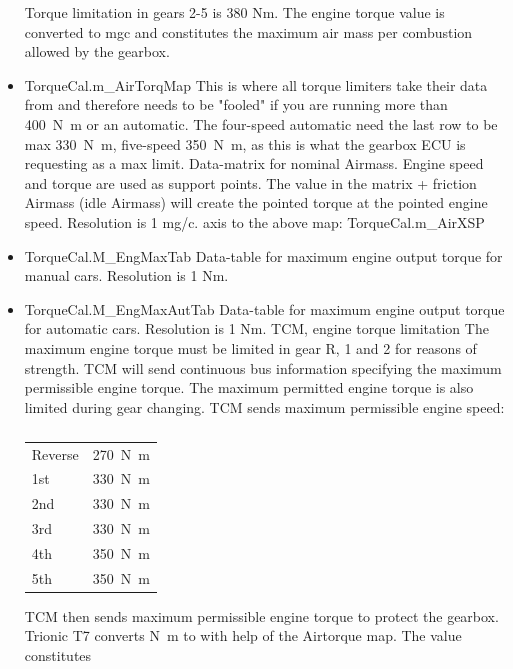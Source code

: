 \documentclass[11pt,a4paper]{book}
\begin{document}
\begin{itemize}
        Torque limitation in gears 2-5 is 380 Nm.
        The engine torque value is converted to \si{mgc} and constitutes the maximum air
        mass per combustion allowed by the gearbox.
    \item
        TorqueCal.m\_AirTorqMap This is where all torque limiters take their data from
        and therefore needs to be "fooled" if you are running more than
        \SI{400}{\newton\meter} or an automatic.
        The four-speed automatic need the last row to be max \SI{330}{\newton\meter},
        five-speed \SI{350}{\newton\meter}, as this is what the gearbox ECU is
        requesting as a max limit. Data-matrix for nominal Airmass. Engine speed and
        torque are used as support points. The value in the matrix + friction Airmass
        (idle Airmass) will create the pointed torque at the pointed engine speed.
        Resolution is 1 mg/c. axis to the above map: TorqueCal.m\_AirXSP
    \item
        TorqueCal.M\_EngMaxTab
        Data-table for maximum engine output torque for manual cars. Resolution is 1 Nm.
    \item
        TorqueCal.M\_EngMaxAutTab
        Data-table for maximum engine output torque for automatic cars. Resolution is 1 Nm.
        TCM, engine torque limitation
        The maximum engine torque must be limited in gear R, 1 and 2 for reasons of strength. TCM will send
        continuous bus information specifying the maximum permissible engine torque. The maximum
        permitted engine torque is also limited during gear changing. TCM sends maximum permissible engine
        speed:
        \begin{table}
            \centering
            \begin{tabular}{ll}
                Reverse & \SI{270}{\newton\meter} \\
                1st & \SI{330}{\newton\meter} \\
                2nd & \SI{330}{\newton\meter} \\
                3rd & \SI{330}{\newton\meter} \\
                4th & \SI{350}{\newton\meter} \\
                5th & \SI{350}{\newton\meter}
            \end{tabular}
            \caption{}
            \label{tab:}
        \end{table}
        TCM then sends maximum permissible engine torque to protect the gearbox.
        Trionic T7 converts \si{\newton\meter} to \si{\mgc} with help of the Airtorque map. The value constitutes

\end{itemize}
\end{document}

